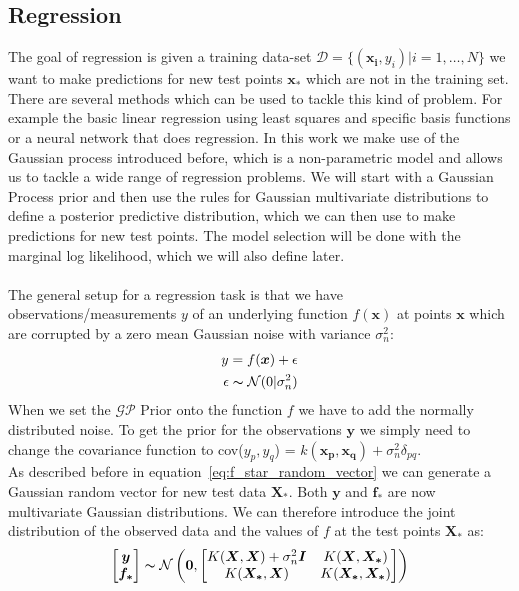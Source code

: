 \documentclass{article}
\begin{document}
\subsection{Regression}\label{sec:Regression}
The goal of regression is given a training data-set $\mathcal{D} =
    \{(\bm{x_i},y_i)|i = 1,\ldots,N\}$ we want to make predictions for new test
points $\bm{x_*}$ which are not in the training set. There are several methods which can be used to tackle this kind of problem. For example the basic linear regression using least squares and specific basis functions or a neural network that does regression. In this work we make use of the Gaussian process introduced before, which is a non-parametric model and allows us to tackle a wide range of regression problems. We will start with a Gaussian Process prior and then use the rules for Gaussian multivariate distributions to define a posterior predictive distribution, which we can then use to make predictions for new test points. The model selection will be done with the marginal log likelihood, which we will also define later.\\
\\
The general setup for a regression task is that we have observations/measurements $y$ of an underlying function $f(\bm{x})$ at points $\bm{x}$ which are corrupted by a zero mean Gaussian noise with variance $\sigma_n^2$:
\begin{align}
    y = f(\bm{x}) + \epsilon \\
    \epsilon \thicksim \mathcal{N}(0|\sigma_n^2) \nonumber
\end{align}
When we set the $\mathcal{GP}$ Prior onto the function $f$ we have to add the normally distributed noise. To get the prior for the observations $\bm{y}$ we simply need to change the covariance function to cov($y_p,y_q$) = $k(\bm{x_p,x_q}) + \sigma_n^2\delta_{pq}$.\\
As described before in equation~\ref{eq:f_star_random_vector} we can generate a Gaussian random vector for new test data $\bm{X_*}$. Both $\bm{y}$ and $\bm{f_*}$ are now multivariate Gaussian distributions. We can therefore introduce the joint distribution of the observed data and the values of $f$ at the test points $\bm{X_*}$ as:
\begin{equation}
    \label{eq:joint_f,X_*}
    \begin{aligned}
        \begin{bmatrix}
            \bm{y} \\
            \bm{f_*}
        \end{bmatrix}
        \thicksim  \mathcal{N}\left(\bm{0},
        \begin{bmatrix}
            K(\bm{X},\bm{X}) + \sigma_n^2 \bm{I} & K(\bm{X},\bm{X_*})   \\
            K(\bm{X_*},\bm{X})                   & K(\bm{X_*},\bm{X_*})
        \end{bmatrix}
        \right)
    \end{aligned}
\end{equation}
\end{document}
